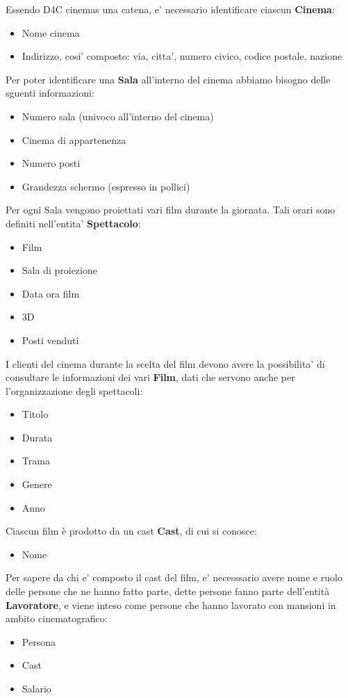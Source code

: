\documentclass[10pt]{article}
\begin{document}
	Essendo D4C cinemas una catena, e' necessario identificare ciascun {\bf Cinema}:
	\begin{itemize}
		\item Nome cinema
		\item Indirizzo, cosi' composto: via, citta', numero civico, codice postale, nazione
	\end{itemize}
	Per poter identificare una {\bf Sala} all'interno del cinema abbiamo bisogno delle sguenti informazioni:
	\begin{itemize}
		\item Numero sala (univoco all'interno del cinema)
		\item Cinema di appartenenza
		\item Numero posti
		\item Grandezza schermo (espresso in pollici)
	\end{itemize}
	Per ogni Sala vengono proiettati vari film durante la giornata. Tali orari sono definiti nell'entita' {\bf Spettacolo}:
	\begin{itemize}
		\item Film
		\item Sala di proiezione
	    \item Data ora film
	    \item 3D
	    \item Posti venduti
	\end{itemize}
	I clienti del cinema durante la scelta del film devono avere la possibilita' di consultare le informazioni dei vari \textbf{Film}, dati che servono anche per l'organizzazione degli spettacoli:
	\begin{itemize}
		\item Titolo
		\item Durata
		\item Trama
		\item Genere
		\item Anno
	\end{itemize}
	Ciascun film è prodotto da un cast {\bf Cast}, di cui si conosce:
	\begin{itemize}
		\item Nome
	\end{itemize}
	Per sapere da chi e' composto il cast del film, e' necesssario avere nome e ruolo delle persone che ne hanno fatto parte, dette persone fanno parte dell'entità {\bf Lavoratore}, e viene inteso come persone che hanno lavorato con mansioni in ambito cinematografico:
	\begin{itemize}
		\item Persona
		\item Cast
		\item Salario
	\end{itemize}
\end{document}
